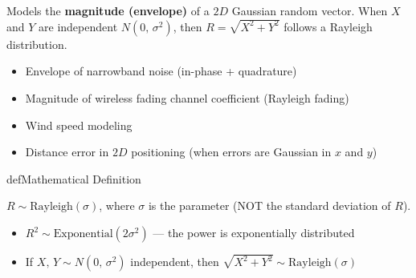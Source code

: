 

Models the \textbf{magnitude (envelope)} of a $2D$ Gaussian random vector. When $X$ and $Y$ are independent $N(0,\, \sigma^{2})$, then $R = \sqrt{X^{2} + Y^{2}}$ follows a Rayleigh distribution.


\begin{itemize}
\tightlist
\item
  Envelope of narrowband noise (in-phase + quadrature)
\item
  Magnitude of wireless fading channel coefficient (Rayleigh fading)
\item
  Wind speed modeling
\item
  Distance error in $2D$ positioning (when errors are Gaussian in $x$ and $y$)
\end{itemize}

\begin{PSbox}[unbreakable]{def}{Mathematical Definition}

$R \sim \mathrm{Rayleigh}(\sigma)$, where $\sigma$ is the parameter (NOT the standard deviation of $R$).

\end{PSbox}










\begin{itemize}
\tightlist
\item
  $R^{2} \sim \mathrm{Exponential}(2\sigma^{2})$ — the power is exponentially distributed
\item
  If $X,\, Y \sim N(0,\, \sigma^{2})$ independent, then $\sqrt{X^{2}+Y^{2}} \sim \mathrm{Rayleigh}(\sigma)$
\end{itemize}

